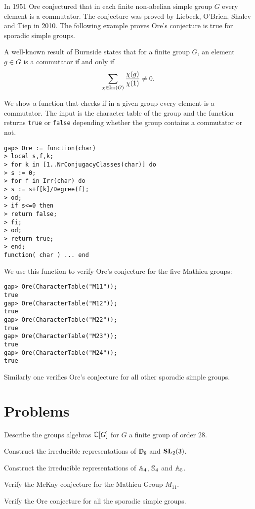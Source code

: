 In 1951 Ore conjectured that in each finite non-abelian simple group $G$ every element is a commutator. 
The conjecture was proved by Liebeck, O'Brien, Shalev and Tiep in 2010. The following example
proves 
Ore's conjecture is true
for sporadic simple groups. 

\begin{example}
A well-known result of Burnside states that 
for a finite group $G$, an element $g\in G$ is a commutator if and only if 
\[
\sum_{\chi\in\operatorname{Irr}(G)}\frac{\chi(g)}{\chi(1)}\ne 0.
\]

We show a function that checks if in a given group 
every element is a commutator. The input is the character table of the group and
the function returns \lstinline{true} or \lstinline{false} depending whether 
the group contains a commutator or not. 
\begin{lstlisting}
gap> Ore := function(char) 
> local s,f,k;
> for k in [1..NrConjugacyClasses(char)] do
> s := 0;
> for f in Irr(char) do
> s := s+f[k]/Degree(f);  
> od;
> if s<=0 then
> return false;
> fi;
> od;
> return true;
> end;
function( char ) ... end
\end{lstlisting}

We use this function to verify Ore's conjecture for the five Mathieu groups:
\begin{lstlisting}
gap> Ore(CharacterTable("M11"));
true
gap> Ore(CharacterTable("M12"));
true
gap> Ore(CharacterTable("M22"));
true
gap> Ore(CharacterTable("M23"));
true
gap> Ore(CharacterTable("M24"));
true
\end{lstlisting}
Similarly one verifies Ore's conjecture for all other sporadic simple groups. 
\end{example}

\section{Problems}

\begin{prob}
	\label{prob:groupalgebra}
	Describe the groups algebras $\mathbb{C}[G]$ for $G$ a finite group of order $28$.
\end{prob}

\begin{prob}
	Construct the irreducible representations of $\mathbb{D}_8$ and $\mathbf{SL}_2(3)$.
\end{prob}

\begin{prob}
	Construct the irreducible representations of 
	$\mathbb{A}_4$, $\mathbb{S}_4$ and $\mathbb{A}_5$.
\end{prob}

\begin{prob}
	\label{prob:McKay:M11}
	Verify the McKay conjecture for the Mathieu Group $M_{11}$.
\end{prob}

\begin{prob}
	\label{prob:Ore}
	Verify the Ore conjecture for all the sporadic simple groups. 
\end{prob}

